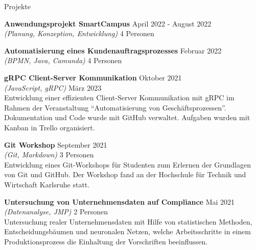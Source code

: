 \documentclass{resume} %
\begin{document}
\begin{rSection}{Projekte}
\begin{adjustwidth}{0.5cm}{}
        \item \textbf{Anwendungsprojekt SmartCampus} \hfill {April 2022 - August 2022} \\
        \textit{(Planung, Konzeption, Entwicklung)} \hfill {4 Personen} \\
        
        \item \textbf{Automatisierung eines Kundenauftragsprozesses} \hfill {Februar 2022} \\
        \textit{(BPMN, Java, Camunda)} \hfill {4 Personen}\\
    
        \item \textbf{gRPC Client-Server Kommunikation} \hfill {Oktober 2021} \\
        \textit{(JavaScript, gRPC)} \hfill {März 2023}\\
        {Entwicklung einer effizienten Client-Server Kommunikation mit gRPC im Rahmen der Veranstaltung “Automatisierung von Geschäftsprozessen”.
        Dokumentation und Code wurde mit GitHub verwaltet. Aufgaben wurden mit Kanban in Trello organisiert.}
        
        \item \textbf{Git Workshop} \hfill {September 2021} \\
        \textit{(Git, Markdown)} \hfill {3 Personen}\\
        {Entwicklung eines Git-Workshops für Studenten zum Erlernen der Grundlagen von Git und GitHub.
        Der Workshop fand an der Hochschule für Technik und Wirtschaft Karlsruhe statt.}
    
        \item \textbf{Untersuchung von Unternehmensdaten auf Compliance} \hfill {Mai 2021} \\
        \textit{(Datenanalyse, JMP)} \hfill {2 Personen} \\
        {Untersuchung realer Unternehmensdaten mit Hilfe von statistischen Methoden, Entscheidungsbäumen und neuronalen Netzen,
        welche Arbeitsschritte in einem Produktionsprozess die Einhaltung der Vorschriften beeinflussen.}
    

\end{adjustwidth}
\end{rSection}
\end{document}
